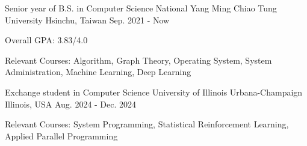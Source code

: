 

\begin{cventries}

  \cventry
    {Senior year of B.S. in Computer Science} %
    {National Yang Ming Chiao Tung University} %
    {Hsinchu, Taiwan} %
    {Sep. 2021 - Now} %
    {
      \begin{cvitems} %
        \item {Overall GPA: 3.83/4.0}
        \item {Relevant Courses: Algorithm, Graph Theory, Operating System, System Administration, Machine Learning, Deep Learning}
      \end{cvitems}
    }

  \cventry
    {Exchange student in Computer Science} %
    {University of Illinois Urbana-Champaign} %
    {Illinois, USA} %
    {Aug. 2024 - Dec. 2024} %
    {
      \begin{cvitems} %
        \item {Relevant Courses: System Programming, Statistical Reinforcement Learning, Applied Parallel Programming}
      \end{cvitems}
    }

\end{cventries}
